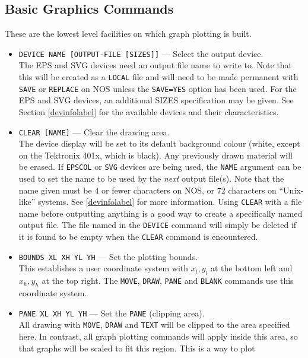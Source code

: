 \documentclass[a4paper,twoside,11pt]{article}
\newcommand{\textttc}[1]{\texttt{\textcolor{OurRed}{#1}}}
\begin{document}
\subsection{Basic Graphics Commands}
These are the lowest level facilities on which graph plotting is built.
\begin{itemize}
\item \textttc{DEVICE NAME [OUTPUT-FILE [SIZES]]} --- Select the output device.\\
   The EPS and SVG devices need an output file name to write to. Note that this
   will be created as a \texttt{LOCAL} file and will need to be made permanent with
   \texttt{SAVE} or \texttt{REPLACE} on NOS unless the \texttt{SAVE=YES} option has been used.
   For the EPS and SVG devices, an additional SIZES specification may be
   given. See Section \ref{devinfolabel} for the available devices and their
   characteristics.
\item \textttc{CLEAR [NAME]} --- Clear the drawing area.\\
  The device display will be set to its default background colour (white, except on
  the Tektronix 401x, which is black).
   Any previously drawn material will be erased. If
   \texttt{EPSCOL} or \texttt{SVG} devices are being used, the \texttt{NAME}
   argument can be used to set the name to be used by the \emph{next} output file(s).
   Note that the name given must be 4 or fewer characters on NOS, or 72 characters
   on ``Unix-like'' systems. See \ref{devinfolabel} for more information. Using
   \texttt{CLEAR} with a file name before outputting anything is a good way to create a
   specifically named output file. The file named in the \texttt{DEVICE} command will
   simply be deleted if it is found to be empty when the \texttt{CLEAR} command is encountered.
\item \textttc{BOUNDS XL XH YL YH} --- Set the plotting bounds.\\
   This establishes a user coordinate system with $x_l,y_l$ at the bottom left
   and $x_h,y_h$ at the top right. The \texttt{MOVE}, \texttt{DRAW}, 
   \texttt{PANE} and \texttt{BLANK} commands use this
   coordinate system.
\item \textttc{PANE XL XH YL YH} --- Set the \texttt{PANE} (clipping area).\\
   All drawing with \texttt{MOVE}, \texttt{DRAW} and \texttt{TEXT} will be clipped to the area specified
   here. In contrast, all graph plotting commands will apply inside this area,
   so that graphs will be scaled to fit this region. This is a way to plot

\end{itemize}
\end{document}
